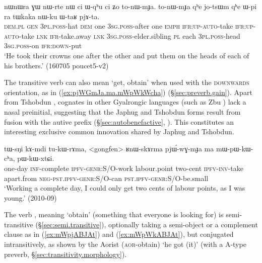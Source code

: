 \begin{exe}
\ex \label{ex:tonWmJa}
\gll  nɯnɯra ɣɯ nɯ-rte nɯ ci ɯ-qʰu ci ʑo to-nɯ-mɟa. to-nɯ-mɟa qʰe jo-tsɯm qʰe ɯ-pi ra tɯkaka nɯ-ku ɯ-taʁ pjɤ-ta. \\
\textsc{dem}.\textsc{pl} \textsc{gen} \textsc{3pl}.\textsc{poss}-hat \textsc{dem} one \textsc{3sg}.\textsc{poss}-after one \textsc{emph} \textsc{ifr}:\textsc{up}-\textsc{auto}-take  \textsc{ifr}:\textsc{up}-\textsc{auto}-take \textsc{lnk} \textsc{ifr}-take.away \textsc{lnk} \textsc{3sg}.\textsc{poss}-elder.sibling \textsc{pl} each \textsc{3pl}.\textsc{poss}-head \textsc{3sg}.\textsc{poss}-on \textsc{ifr}:\textsc{down}-put \\
\glt `He took their crowns one after the other and put them on the heads of each of his brothers.' (160705 poucet5-v2) 
\end{exe}

The transitive verb  can also mean `get, obtain' when used with the \textsc{downwards} orientation, as in (\ref{ex:pjWGmJa.ma.mWpWkWcha}) (§\ref{sec:preverb.gain}). Apart from Tshobdun , cognates in other Gyalrongic languages (such as Zbu ) lack a nasal preinitial, suggesting that the Japhug and Tshobdun forms result from fusion with the autive prefix (§\ref{sec:autobenefactive}, \citealt[310]{gong18these}). This constitutes an interesting exclusive common innovation shared by Japhug and Tshobdun. 

\begin{exe}
\ex \label{ex:pjWGmJa.ma.mWpWkWcha}
\gll tɯ-sŋi kɤ-mdi tu-kɯ-rɤma, <gongfen> ʁnɯ-skɤrma pjɯ́-wɣ-mɟa ma mɯ-pɯ-kɯ-cʰa, pɯ-kɯ-xtɕi.  \\
one-day \textsc{inf}-complete \textsc{ipfv}-\textsc{genr}:S/O-work labour.point two-cent \textsc{ipfv}-\textsc{inv}-take apart.from \textsc{neg}-\textsc{pst}.\textsc{ipfv}-\textsc{genr}:S/O-can \textsc{pst}.\textsc{ipfv}-\textsc{genr}:S/O-be.small \\
\glt `Working a complete day, I could only get two cents of labour points, as I was young.' (2010-09)
\end{exe}

The verb , meaning `obtain' (something that everyone is looking for) is semi-transitive (§\ref{sec:semi.transitive}), optionally taking a semi-object or a complement clause as in (\ref{ex:mWpjABJAt}) and (\ref{ex:mWpWkABJAt}), but conjugated intransitively, as shown by the Aorist  (\textsc{aor}-obtain) `he got (it)' (with a A-type preverb, §\ref{sec:transitivity.morphology}).

